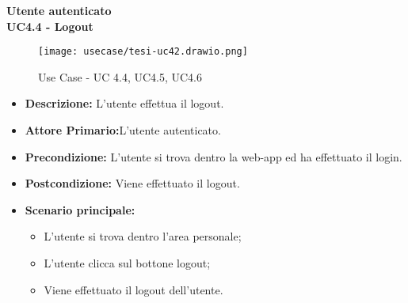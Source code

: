 \textbf{Utente autenticato}\\
\textbf{UC4.4 - Logout}
\begin{figure}[H]
    \centering
    \texttt{[image: usecase/tesi-uc42.drawio.png]}
    \caption{Use Case - UC 4.4, UC4.5, UC4.6}
\end{figure}
\begin{itemize}
    \item \textbf{Descrizione:} L'utente effettua il logout.
    \item \textbf{Attore Primario:}L'utente autenticato.
    \item \textbf{Precondizione:} L'utente si trova dentro la web-app ed ha effettuato il login.
    \item \textbf{Postcondizione:} Viene effettuato il logout.
    \item \textbf{Scenario principale:}
    \begin{itemize}
        \item L'utente si trova dentro l'area personale;
        \item L'utente clicca sul bottone logout;
        \item Viene effettuato il logout dell'utente.
    \end{itemize}
\end{itemize}
